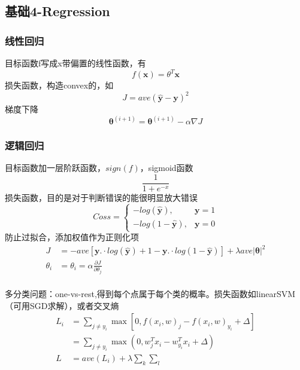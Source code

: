 \documentclass[UTF8]{../computerUniverse}
\begin{document}
\subsection{基础4-Regression}
\subsubsection{线性回归}
目标函数f写成x带偏置的线性函数，有
\begin{equation}
f(\mathbf x)=\theta ^T \mathbf x
\end{equation}
损失函数，构造convex的，如
\begin{equation}
J= ave (\hat {\mathbf y}-\mathbf y)^2
\end{equation}
梯度下降
\begin{equation}
\mathbf \theta ^{(i+1)}=\mathbf \theta ^{(i+1)}-\alpha \nabla J
\end{equation}
 
\subsubsection{逻辑回归}
目标函数加一层阶跃函数，$sign(f)$，sigmoid函数
\begin{equation}
\frac{1}{1+e^{-x}}
\end{equation}
 损失函数，目的是对于判断错误的能很明显放大错误
\begin{equation}
Coss= \left\{
    \begin{aligned}
    -log(\hat {\mathbf y}),&\mathbf y=1\\
    -log(1-\hat {\mathbf y}),&\mathbf y=0
    \end{aligned}
    \right.
\end{equation}
防止过拟合，添加权值作为正则化项
\begin{equation}
    \begin{split}
    J&=-ave \left[
    {\mathbf y}.\cdot log(\hat {\mathbf y})
    +{1-\mathbf y}.\cdot log(1-\hat {\mathbf y})
\right]+\lambda ave|\mathbf \theta   |^2\\
        \theta_i&=\theta_i =\alpha \frac{\partial J}{\partial \theta_j}\\
    \end{split}
\end{equation}
 
多分类问题：one-vs-rest,得到每个点属于每个类的概率。损失函数如linearSVM（可用SGD求解），或者交叉熵
\begin{equation}
\begin{split}
    L_i & = \sum_{j\neq y_i} \max \left[ 0,f(x_i,w)_j-f(x_i,w)_{y_i}+\Delta  \right]\\
    &=\sum_{j \neq y_i} \max \left( 0,w_j^Tx_i-w_{y_i}^Tx_i +\Delta \right)\\
    L& = ave(L_i)+\lambda\sum_k \sum_l
\end{split}
\end{equation}
\end{document}
